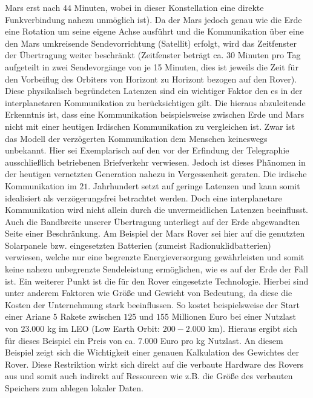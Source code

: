 Mars erst nach $44$ Minuten, wobei in dieser Konstellation eine direkte
Funkverbindung nahezu unm{\"o}glich ist).
Da der Mars jedoch genau wie die Erde eine Rotation um seine eigene Achse
ausf{\"u}hrt und die Kommunikation {\"u}ber eine den Mars
umkreisende Sendevorrichtung (Satellit) erfolgt, wird das Zeitfenster der
{\"U}bertragung weiter beschr{\"a}nkt (Zeitfenster betr{\"a}gt ca. 30 Minuten
pro Tag aufgeteilt in zwei Sendevorg{\"a}nge von je 15 Minuten, dies ist jeweils
die Zeit f{\"u}r den Vorbeiflug des Orbiters von Horizont zu Horizont bezogen
auf den Rover).
Diese physikalisch begr{\"u}ndeten Latenzen sind ein wichtiger Faktor den es in der interplanetaren Kommunikation zu ber{\"u}cksichtigen gilt. Die hieraus abzuleitende Erkenntnis ist, dass eine Kommunikation beispielsweise zwischen Erde und Mars nicht mit einer heutigen
Irdischen Kommunikation zu vergleichen ist. Zwar ist das Modell der
verz{\"o}gerten Kommunikation dem Menschen keineswegs unbekannt.
Hier sei Exemplarisch auf den vor der Erfindung der Telegraphie
ausschlie{\ss}lich betriebenen Briefverkehr verwiesen. Jedoch ist dieses
Ph{\"a}nomen in der heutigen vernetzten Generation nahezu in Vergessenheit
geraten. Die irdische Kommunikation im $21$. Jahrhundert setzt auf geringe
Latenzen und kann somit idealisiert als verz{\"o}gerungsfrei betrachtet werden.
Doch eine interplanetare Kommunikation wird nicht allein durch die
unvermeidlichen Latenzen beeinflusst. Auch die Bandbreite unserer
{\"U}bertragung unterliegt auf der Erde abgewandten Seite
einer Beschr{\"a}nkung. Am Beispiel der Mars Rover sei hier auf die genutzten
Solarpanele bzw. eingesetzten Batterien (zumeist Radionuklidbatterien)
verwiesen, welche nur eine begrenzte Energieversorgung gew{\"a}hrleisten und
somit keine nahezu unbegrenzte Sendeleistung erm{\"o}glichen, wie es auf der
Erde der Fall ist.
Ein weiterer Punkt ist die f{\"u}r den Rover eingesetzte Technologie. Hierbei 
sind unter anderem Faktoren wie Gr{\"o}{\ss}e und Gewicht von Bedeutung, da 
diese die Kosten der Unternehmung stark beeinflussen. So kostet beispielsweise 
der Start einer Ariane $5$ Rakete zwischen $125$ und $155$ Millionen Euro bei 
einer Nutzlast von $23.000$ kg im LEO (Low Earth Orbit: $200-2.000$ km). Hieraus 
ergibt sich f{\"u}r dieses Beispiel ein Preis von ca. $7.000$ Euro pro kg 
Nutzlast. An diesem Beispiel zeigt sich die Wichtigkeit einer genauen
Kalkulation des Gewichtes der Rover. Diese Restriktion wirkt sich direkt auf die
verbaute Hardware des Rovers aus und somit auch indirekt auf Ressourcen wie z.B.
die Gr{\"o}{\ss}e des verbauten Speichers zum ablegen lokaler Daten.

